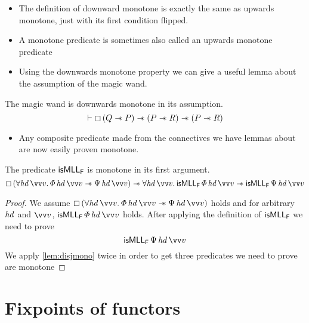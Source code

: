 \documentclass[thesis.tex]{subfiles}
\begin{document}
\begin{itemize}
    \item The definition of downward monotone is exactly the same as upwards monotone, just with its first condition flipped.
    \item A monotone predicate is sometimes also called an upwards monotone predicate
    \item Using the downwards monotone property we can give a useful lemma about the assumption of the magic wand.
\end{itemize}
\begin{lemma}
    \label{lem:wandassmono}
    The magic wand is downwards monotone in its assumption.
    \[\proves\always{(\propB\wand\prop)}\wand(\prop\wand\propC)\wand(\prop\wand\propC)\]
\end{lemma}
\begin{itemize}
    \item Any composite predicate made from the connectives we have lemmas about are now easily proven monotone.
\end{itemize}
\begin{example}
    The predicate $\textsf{\upshape isMLL}_{\textsf{\upshape F}}$ is monotone in its first argument.
    \[
        \always{(\All \langv{hd}\, \vect{v}. \pred\, \langv{hd}\, \vect{v} \wand \predB\, \langv{hd}\, \vect{v})} \wand \All \langv{hd}\, \vect{v}. \isMLL_\hopred\, \pred\, \langv{hd}\, \vect{v} \wand \isMLL_\hopred\, \predB\, \langv{hd}\, \vect{v}
    \]
\end{example}
\begin{proof}
    We assume $\always{(\All \langv{hd}\, \vect{v}. \pred\, \langv{hd}\, \vect{v} \wand \predB\, \langv{hd}\, \vect{v})}$ holds and for arbitrary $\mathit{hd}$ and $\vect{v}$, $\isMLL_\hopred\, \pred\, \langv{hd}\, \vect{v}$ holds.
    After applying the definition of $\textsf{\upshape isMLL}_{\textsf{\upshape F}}$ we need to prove \[\isMLL_\hopred\, \predB\, \langv{hd}\, \vect{v}\]
    We apply \cref*{lem:disjmono} twice in order to get three predicates we need to prove are monotone
\end{proof}

\section{Fixpoints of functors}
\end{document}
